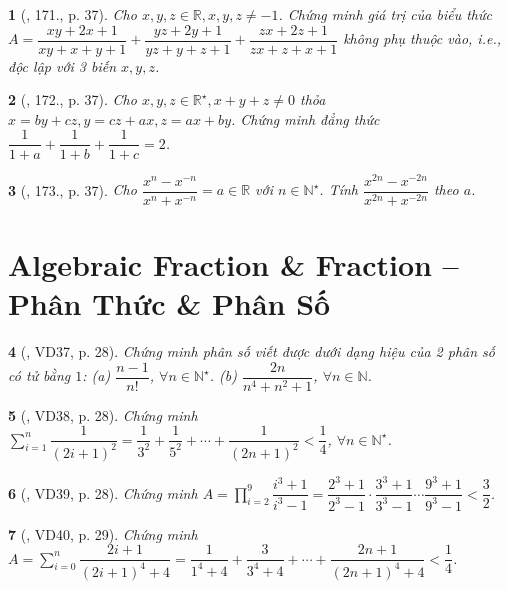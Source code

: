 \documentclass{article}
\newtheorem{baitoan}{}
\begin{document}
\begin{baitoan}[\cite{Tuyen_Toan_8}, 171., p. 37]
	Cho $x,y,z\in\mathbb{R},x,y,z\ne-1$. Chứng minh giá trị của biểu thức $A = \dfrac{xy + 2x + 1}{xy + x + y + 1}  + \dfrac{yz + 2y + 1}{yz + y + z + 1} + \dfrac{zx + 2z + 1}{zx + z + x + 1}$ không phụ thuộc vào, i.e., độc lập với 3 biến $x,y,z$.
\end{baitoan}

\begin{baitoan}[\cite{Tuyen_Toan_8}, 172., p. 37]
	Cho $x,y,z\in\mathbb{R}^\star,x + y + z\ne0$ thỏa $x = by + cz,y = cz + ax,z = ax + by$. Chứng minh đẳng thức $\dfrac{1}{1 + a} + \dfrac{1}{1 + b} + \dfrac{1}{1 + c} = 2$.
\end{baitoan}

\begin{baitoan}[\cite{Tuyen_Toan_8}, 173., p. 37]
	Cho $\dfrac{x^n - x^{-n}}{x^n + x^{-n}} = a\in\mathbb{R}$ với $n\in\mathbb{N}^\star$. Tính $\dfrac{x^{2n} - x^{-2n}}{x^{2n} + x^{-2n}}$ theo $a$.
\end{baitoan}


\section{Algebraic Fraction \& Fraction -- Phân Thức \& Phân Số}

\begin{baitoan}[\cite{Binh_Toan_8_tap_1}, VD37, p. 28]
	Chứng minh phân số viết được dưới dạng hiệu của 2 phân số có tử bằng $1$: (a) $\dfrac{n - 1}{n!}$, $\forall n\in\mathbb{N}^\star$. (b) $\dfrac{2n}{n^4 + n^2 + 1}$, $\forall n\in\mathbb{N}$.
\end{baitoan}

\begin{baitoan}[\cite{Binh_Toan_8_tap_1}, VD38, p. 28]
	Chứng minh $\sum_{i=1}^n \dfrac{1}{(2i + 1)^2} = \dfrac{1}{3^2} + \dfrac{1}{5^2} + \cdots + \dfrac{1}{(2n + 1)^2} < \dfrac{1}{4}$, $\forall n\in\mathbb{N}^\star$.
\end{baitoan}

\begin{baitoan}[\cite{Binh_Toan_8_tap_1}, VD39, p. 28]
	Chứng minh $A = \prod_{i=2}^9 \dfrac{i^3 + 1}{i^3 - 1} = \dfrac{2^3 + 1}{2^3 - 1}\cdot\dfrac{3^3 + 1}{3^3 - 1}\cdots\dfrac{9^3 + 1}{9^3 - 1} < \dfrac{3}{2}$.
\end{baitoan}

\begin{baitoan}[\cite{Binh_Toan_8_tap_1}, VD40, p. 29]
	Chứng minh $A = \sum_{i=0}^n \dfrac{2i + 1}{(2i + 1)^4 + 4} = \dfrac{1}{1^4 + 4} + \dfrac{3}{3^4 + 4} + \cdots + \dfrac{2n + 1}{(2n + 1)^4 + 4} < \dfrac{1}{4}$.
\end{baitoan}
\end{document}

